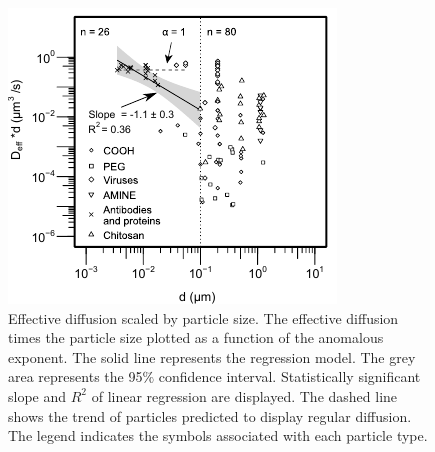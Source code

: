 \documentclass[a4paper]{article}
\begin{document}
\clearpage
\begin{figure}[H]
    \centering
    \includegraphics[width = 12 cm]{Figure_SI_diffusion_times_size.pdf}
    \caption{Effective diffusion scaled by particle size. The effective diffusion times the particle size plotted as a function of the anomalous exponent. The solid line represents the regression model. The grey area represents the 95$\%$ confidence interval. Statistically significant slope and $R^2$ of linear regression are displayed. The dashed line shows the trend of particles predicted to display regular diffusion. The legend indicates the symbols associated with each particle type. 
    }
    \label{fig:DiffTimesSize}
\end{figure}

\clearpage
\end{document}
